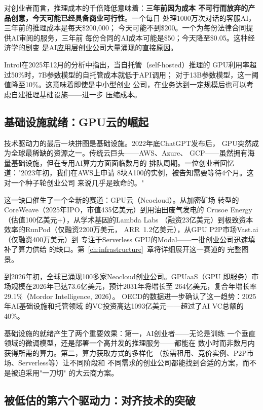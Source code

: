 对创业者而言，推理成本的千倍降低意味着：\textbf{三年前因为成本
不可行而放弃的产品创意，今天可能已经具备商业可行性}。一个每日
处理1000万次对话的客服AI，三年前的推理成本是每天\$200,000；
今天可能不到\$200。一个为每份法律合同提供AI审阅的服务，三年前
每份合同的AI成本可能是\$50；今天降至\$0.05。这种经济学的剧变
是AI应用层创业公司大量涌现的直接原因。

Introl在2025年12月的分析中指出，当自托管（self-hosted）推理的
GPU利用率超过50\%时，7B参数模型的自托管成本就低于API调用；
对于13B参数模型，这一阈值降至10\%。这意味着即使是中小型创业
公司，在业务达到一定规模后也可以考虑自建推理基础设施——进一步
压缩成本。

\subsection{基础设施就绪：GPU云的崛起}

技术驱动力的最后一块拼图是基础设施。2022年底ChatGPT发布后，
GPU突然成为全球最稀缺的资源之一。传统云巨头——AWS、Azure、
GCP——虽然拥有海量基础设施，但在专用AI算力方面面临数月的
排队周期。一位创业者回忆道："2023年初，我们在AWS上申请
8块A100的实例，被告知需要等待4个月。这对一个种子轮创业公司
来说几乎是致命的。"

这一缺口催生了一个全新的赛道：GPU云（Neocloud）。从加密矿场
转型的CoreWeave（2025年IPO，市值435亿美元）到用油田废气发电的
Crusoe Energy（估值100亿美元+），从学术基因的Lambda Labs
（融资23亿美元）到极致资本效率的RunPod（仅融资2200万美元，
ARR~1.2亿美元），从GPU P2P市场Vast.ai（仅融资400万美元）到
专注于Serverless GPU的Modal——一批创业公司迅速填补了算力供给
的缺口。第~\ref{ch:infrastructure}~章将详细展开这一赛道的
完整图景。

到2026年初，全球已涌现100多家Neocloud创业公司。GPUaaS（GPU
即服务）市场规模在2026年已达73.6亿美元，预计2031年将增长至
264亿美元，复合年增长率29.1\%（Mordor Intelligence, 2026）。
OECD的数据进一步确认了这一趋势：2025年AI基础设施和托管领域
的VC投资高达1093亿美元——超过了AI VC总额的40\%。

基础设施的就绪产生了两个重要效果：第一，AI创业者——无论是训练
一个垂直领域的微调模型，还是部署一个高并发的推理服务——都能在
数小时而非数月内获得所需的算力。第二，算力获取方式的多样化
（按需租用、竞价实例、P2P市场、Serverless等）让不同阶段和
不同需求的创业公司都能找到合适的方案，而不是被迫采用"一刀切"
的大云商方案。

\subsection{被低估的第六个驱动力：对齐技术的突破}


